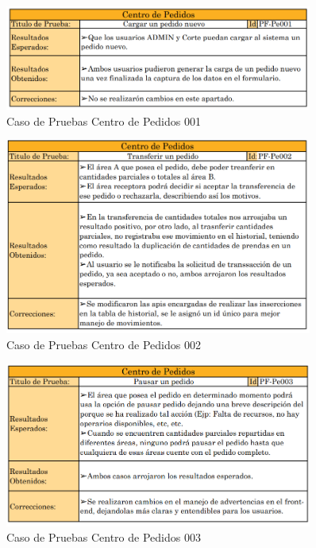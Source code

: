 \documentclass[12pt,letterpaper,spanish]{report}
\begin{document}
\begin{figure}[H]
  \centering
  \includegraphics[width=0.9\textwidth]{PF-Pe001.png}
  \caption{Caso de Pruebas Centro de Pedidos 001}\label{Pe001}
\end{figure}

\begin{figure}[H]
  \centering
  \includegraphics[width=0.9\textwidth]{PF-Pe002.png}
  \caption{Caso de Pruebas Centro de Pedidos 002}\label{Pe002}
\end{figure}

\begin{figure}[H]
  \centering
  \includegraphics[width=0.9\textwidth]{PF-Pe003.png}
  \caption{Caso de Pruebas Centro de Pedidos 003}\label{Pe003}
\end{figure}
\end{document}

